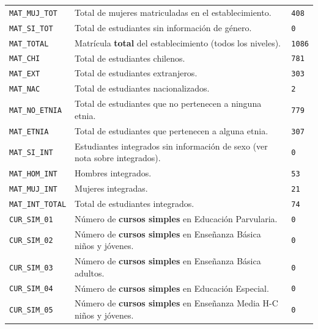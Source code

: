 \documentclass[10.5pt]{article}
\begin{document}
\begin{xltabular}{\linewidth}{@{}p{4.5cm} >{\raggedright\arraybackslash}X p{3.4cm}@{}}
\texttt{MAT\_\allowbreak{}MUJ\_\allowbreak{}TOT} & Total de mujeres matriculadas en el establecimiento. & \texttt{408} \\
\texttt{MAT\_\allowbreak{}SI\_\allowbreak{}TOT} & Total de estudiantes sin información de género. & \texttt{0} \\
\texttt{MAT\_\allowbreak{}TOTAL} & Matrícula \textbf{total} del establecimiento (todos los niveles). & \texttt{1086} \\
\texttt{MAT\_\allowbreak{}CHI} & Total de estudiantes chilenos. & \texttt{781} \\
\texttt{MAT\_\allowbreak{}EXT} & Total de estudiantes extranjeros. & \texttt{303} \\
\texttt{MAT\_\allowbreak{}NAC} & Total de estudiantes nacionalizados. & \texttt{2} \\
\texttt{MAT\_\allowbreak{}NO\_\allowbreak{}ETNIA} & Total de estudiantes que no pertenecen a ninguna etnia. & \texttt{779} \\
\texttt{MAT\_\allowbreak{}ETNIA} & Total de estudiantes que pertenecen a alguna etnia. & \texttt{307} \\
\texttt{MAT\_\allowbreak{}SI\_\allowbreak{}INT} & Estudiantes integrados sin información de sexo (ver nota sobre integrados). & \texttt{0} \\
\texttt{MAT\_\allowbreak{}HOM\_\allowbreak{}INT} & Hombres integrados. & \texttt{53} \\
\texttt{MAT\_\allowbreak{}MUJ\_\allowbreak{}INT} & Mujeres integradas. & \texttt{21} \\
\texttt{MAT\_\allowbreak{}INT\_\allowbreak{}TOTAL} & Total de estudiantes integrados. & \texttt{74} \\
\texttt{CUR\_\allowbreak{}SIM\_\allowbreak{}01} & Número de \textbf{cursos simples} en Educación Parvularia. & \texttt{0} \\
\texttt{CUR\_\allowbreak{}SIM\_\allowbreak{}02} & Número de \textbf{cursos simples} en Enseñanza Básica niños y jóvenes. & \texttt{0} \\
\texttt{CUR\_\allowbreak{}SIM\_\allowbreak{}03} & Número de \textbf{cursos simples} en Enseñanza Básica adultos. & \texttt{0} \\
\texttt{CUR\_\allowbreak{}SIM\_\allowbreak{}04} & Número de \textbf{cursos simples} en Educación Especial. & \texttt{0} \\
\texttt{CUR\_\allowbreak{}SIM\_\allowbreak{}05} & Número de \textbf{cursos simples} en Enseñanza Media H-C niños y jóvenes. & \texttt{0} \\

\end{xltabular}
\end{document}
